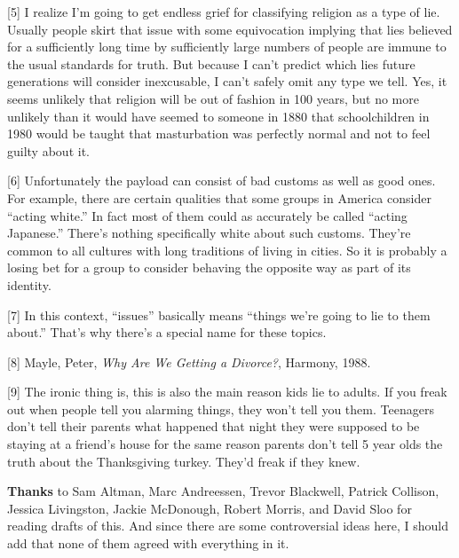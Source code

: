 {[}5{]} I realize I'm going to get endless grief for classifying
religion as a type of lie. Usually people skirt that issue with some
equivocation implying that lies believed for a sufficiently long time by
sufficiently large numbers of people are immune to the usual standards
for truth. But because I can't predict which lies future generations
will consider inexcusable, I can't safely omit any type we tell. Yes, it
seems unlikely that religion will be out of fashion in 100 years, but no
more unlikely than it would have seemed to someone in 1880 that
schoolchildren in 1980 would be taught that masturbation was perfectly
normal and not to feel guilty about it.

{[}6{]} Unfortunately the payload can consist of bad customs as well as
good ones. For example, there are certain qualities that some groups in
America consider ``acting white.'' In fact most of them could as
accurately be called ``acting Japanese.'' There's nothing specifically
white about such customs. They're common to all cultures with long
traditions of living in cities. So it is probably a losing bet for a
group to consider behaving the opposite way as part of its identity.

{[}7{]} In this context, ``issues'' basically means ``things we're going
to lie to them about.'' That's why there's a special name for these
topics.

{[}8{]} Mayle, Peter, \emph{Why Are We Getting a Divorce?}, Harmony,
1988.

{[}9{]} The ironic thing is, this is also the main reason kids lie to
adults. If you freak out when people tell you alarming things, they
won't tell you them. Teenagers don't tell their parents what happened
that night they were supposed to be staying at a friend's house for the
same reason parents don't tell 5 year olds the truth about the
Thanksgiving turkey. They'd freak if they knew.

\textbf{Thanks} to Sam Altman, Marc Andreessen, Trevor Blackwell,
Patrick Collison, Jessica Livingston, Jackie McDonough, Robert Morris,
and David Sloo for reading drafts of this. And since there are some
controversial ideas here, I should add that none of them agreed with
everything in it.
